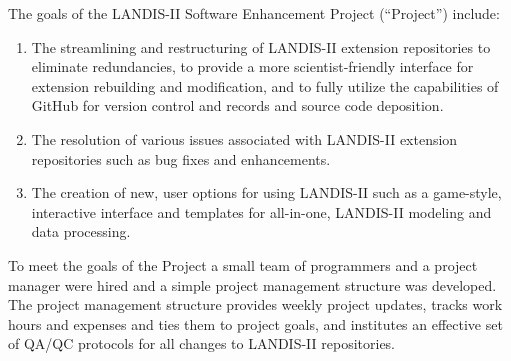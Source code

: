 \documentclass[letterpaper,11pt]{texMemo}
\begin{document}
\maketitle
The goals of the LANDIS-II Software Enhancement Project (\enquote{Project}) include:
\begin{enumerate}
  \item The streamlining and restructuring of LANDIS-II extension repositories to eliminate redundancies, to provide a more scientist-friendly interface for extension rebuilding and modification, and to fully utilize the capabilities of GitHub for version control and records and source code deposition.
  \item The resolution of various issues associated with LANDIS-II extension repositories such as bug fixes and enhancements.
  \item The creation of new, user options for using LANDIS-II such as a game-style, interactive interface and templates for all-in-one, LANDIS-II modeling and data processing. 
\end{enumerate}

To meet the goals of the Project a small team of programmers and a project manager were hired and a simple project management structure was developed. The project management structure provides weekly project updates, tracks work hours and expenses and ties them to project goals, and institutes an effective set of QA/QC protocols for all changes to LANDIS-II repositories.\\
\end{document}
